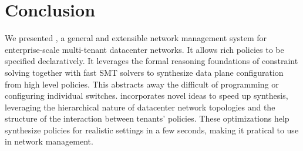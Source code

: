 \section{Conclusion}

We presented \Name, a general and extensible network management system
for enterprise-scale multi-tenant datacenter networks. It allows
rich policies to be specified declaratively. It leverages
the formal reasoning foundations of constraint solving together with
fast SMT solvers to synthesize data plane configuration from high
level policies. This abstracts away the difficult of programming or
configuring individual switches. \Name incorporates novel ideas to
speed up synthesis, leveraging the hierarchical nature of datacenter
network topologies and the structure of the interaction between
tenants' policies. These optimizations help \Name synthesize policies
for realistic settings in a few seconds, making it pratical to use in
network management.

